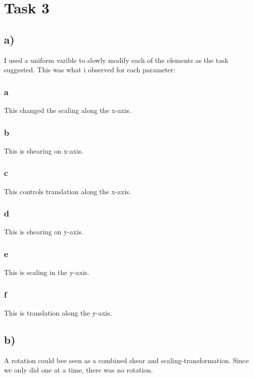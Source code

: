 \section{Task 3}
\subsection{a)}
I used a uniform varible to slowly modify each of the elements as the task suggested. This was what i observed for each parameter:

\subsubsection{a}
This changed the scaling along the x-axis.
\subsubsection{b}
This is shearing on x-axis.
\subsubsection{c}
This controls translation along the x-axis.
\subsubsection{d}
This is shearing on y-axis.
\subsubsection{e}
This is scaling in the y-axis.
\subsubsection{f}
This is translation along the y-axis.

\subsection{b)}
A rotation could bee seen as a combined shear and scaling-transformation. Since we only did one at a time, there was no rotation.
